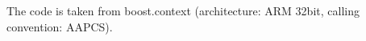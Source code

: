\newpage
{}\label{appendixa}

The code is taken from boost.context\cite{bcontext} (architecture: ARM 32bit,
calling convention: AAPCS).

